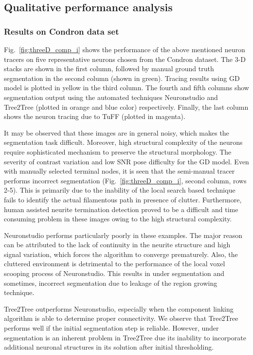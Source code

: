 \subsection{Qualitative performance analysis}

\subsubsection{Results on Condron data set}
Fig.~\ref{fig:threeD_comp_i} shows the performance of the above mentioned neuron tracers on five representative neurons chosen from the Condron dataset. The 3-D stacks are shown in the first column, followed by manual ground truth segmentation in the second column (shown in green). Tracing results using GD model \cite{peng_GAD} is plotted in yellow in the third column. The fourth and fifth columns show segmentation output using the automated techniques Neuronstudio and Tree2Tree (plotted in orange and blue color) respectively. Finally, the last column shows the neuron tracing due to TuFF (plotted in magenta).

It may be observed that these images are in general noisy, which makes the segmentation task difficult. Moreover, high structural complexity of the neurons require sophisticated mechanism to preserve the structural morphology. The severity of contrast variation and low SNR pose difficulty for the GD model. Even with manually selected terminal nodes, it is seen that the semi-manual tracer performs incorrect segmentation (Fig.~\ref{fig:threeD_comp_i}, second column, rows 2-5). This is primarily due to the inability of the local search based technique fails to identify the actual filamentous path in presence of clutter. Furthermore, human assisted neurite termination detection proved to be a difficult and time consuming problem in these images owing to the high structural complexity. 

Neuronstudio performs particularly poorly in these examples. The major reason can be attributed to the lack of continuity in the neurite structure and high signal variation, which forces the algorithm to converge prematurely. Also, the cluttered environment is detrimental to the performance of the local voxel scooping process of Neuronstudio. This results in under segmentation and sometimes, incorrect segmentation due to leakage of the region growing technique.

Tree2Tree outperforms Neuronstudio, especially when the component linking algorithm is able to determine proper connectivity. We observe that Tree2Tree performs well if the initial segmentation step is reliable. However, under segmentation is an inherent problem in Tree2Tree due its inability to incorporate additional neuronal structures in its solution after initial thresholding.

